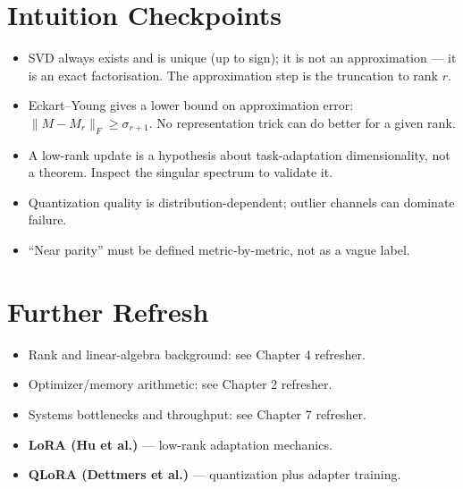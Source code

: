 \section*{Intuition Checkpoints}
\begin{itemize}[leftmargin=1.5em]
  \item SVD always exists and is unique (up to sign); it is not an approximation --- it is an exact factorisation. The approximation step is the truncation to rank $r$.
  \item Eckart--Young gives a lower bound on approximation error: $\|M-M_r\|_F \ge \sigma_{r+1}$. No representation trick can do better for a given rank.
  \item A low-rank update is a hypothesis about task-adaptation dimensionality, not a theorem. Inspect the singular spectrum to validate it.
  \item Quantization quality is distribution-dependent; outlier channels can dominate failure.
  \item ``Near parity'' must be defined metric-by-metric, not as a vague label.
\end{itemize}

\section*{Further Refresh}
\begin{itemize}[leftmargin=1.5em]
  \item Rank and linear-algebra background: see Chapter 4 refresher.
  \item Optimizer/memory arithmetic: see Chapter 2 refresher.
  \item Systems bottlenecks and throughput: see Chapter 7 refresher.
  \item \textbf{LoRA (Hu et al.)} --- low-rank adaptation mechanics.
  \item \textbf{QLoRA (Dettmers et al.)} --- quantization plus adapter training.
\end{itemize}
